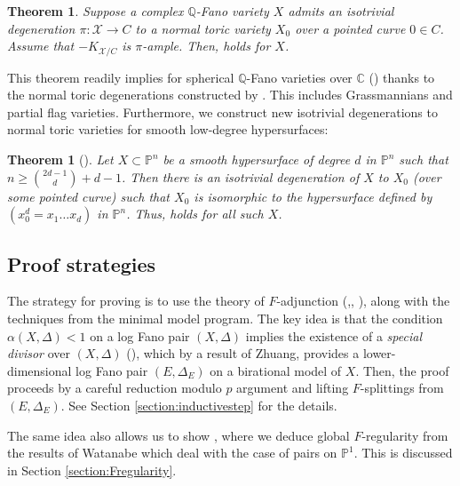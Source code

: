 \documentclass[11pt,reqno]{amsart}
\newcommand{\C}{\mathbb{C}}
\newcommand{\Q}{\mathbb{Q}}
\renewcommand{\P}{\mathbb{P}}
\newcommand{\cX}{\mathcal{X}}
\newcommand{\PP}{\mathbb{P}}
\numberwithin{equation}{section}
\newtheorem{thm}[prop] {Theorem}
\theoremstyle{definition}
\begin{document}
\begin{thm}
     Suppose a complex $\Q$-Fano variety $X$ admits an isotrivial degeneration $\pi: \cX \to C$ to a normal toric variety $X_0$ over a pointed curve $0 \in C$. Assume that $-K_{\cX/C}$ is $\pi$-ample. Then,  holds for $X$.
\end{thm}

This theorem readily implies  for spherical $\Q$-Fano varieties over $\C$ () thanks to the normal toric degenerations constructed by \cite{AlexeevBrionToricDegenerationsofspherical}. This includes Grassmannians and partial flag varieties. Furthermore, we construct new isotrivial degenerations to normal toric varieties for smooth low-degree hypersurfaces: 

\begin{thm}[] \label{mainthm2intro}
    Let $X \subset \P^n$ be a smooth hypersurface of degree $d$ in $\P^n$ such that $n \geq \binom{2d-1}{d} + d -1$. Then there is an isotrivial degeneration of $X$ to $X_0$ (over some pointed curve) such that $X_0$ is isomorphic to the hypersurface defined by $(x_0 ^d = x_1 \dots x_d)$ in $\P^n$. Thus,  holds for all such $X$.
\end{thm}


 \subsection{Proof strategies} The strategy for proving  is to use the theory of $F$-adjunction (\cite{SchwedeFAdjunction},\cite{CasciniGongyoSchwedeUniformBounds}, \cite{CTW17}), along with the techniques from the minimal model program. The key idea is that the condition $\alpha (X, \Delta) < 1$ on a log Fano pair $(X, \Delta)$ implies the existence of a \emph{special divisor} over $(X, \Delta)$ (\cite{BLX22}), which by a result of Zhuang, provides a lower-dimensional log Fano pair $(E, \Delta_E)$ on a birational model of $X$. Then, the proof proceeds by a careful reduction modulo $p$ argument and lifting $F$-splittings from $(E, \Delta_E)$. See Section \ref{section:inductivestep} for the details.
 
 The same idea also allows us to show , where we deduce global $F$-regularity from the results of Watanabe \cite{WatanabeFregularFpureRings} which deal with the case of pairs on $\PP^1$. This is discussed in Section \ref{section:Fregularity}.
\end{document}
